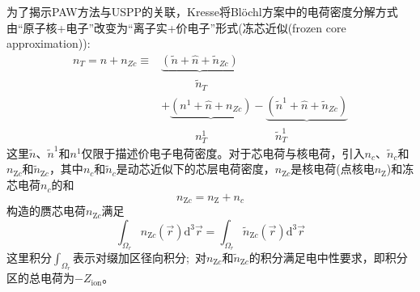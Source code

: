 \documentclass{article}      %
\begin{document}
为了揭示\textrm{PAW}方法与\textrm{USPP}的关联，\textrm{Kresse}将\textrm{Bl\"ochl}方案中的电荷密度分解方式由“原子核+电子”改变为“离子实+价电子”形式(冻芯近似(\textrm{frozen core approximation})):~
\begin{equation}
	\begin{aligned}
		n_T=n+n_{Zc}\equiv&\underbrace{(\tilde n+\hat n+\tilde n_{Zc})}\\
				 		&\quad\qquad\tilde n_T\\
				  &+\underbrace{(n^1+\hat n+n_{Zc})}-\underbrace{(\tilde n^1+\hat n+\tilde n_{Zc})}\\
				                  &\quad\qquad n_T^1\qquad\qquad\qquad\tilde n_T^1
	\end{aligned}
	\label{eq:PAW_Kresse_02}
\end{equation}
这里$\tilde n$、$\tilde n^1$和$n^1$仅限于描述价电子电荷密度。对于芯电荷与核电荷，引入$n_c$、$\tilde n_c$和$n_{\mathrm{Z}c}$和$\tilde n_{\mathrm{Z}c}$，其中$n_c$和$\tilde n_c$是动芯近似下的芯层电荷密度，$n_{\mathrm{Z}c}$是核电荷(点核电$n_{\mathrm Z}$)和冻芯电荷$n_c$的和
\begin{displaymath}
	n_{\mathrm{Z}c}=n_{\mathrm{Z}}+n_c
\end{displaymath}
构造的赝芯电荷$n_{\mathrm{Z}c}$满足
\begin{equation}
	\int_{\Omega_r}n_{\mathrm{Z}c}(\vec r)\mathrm{d}^3\vec r=\int_{\Omega_r}\tilde n_{\mathrm{Z}c}(\vec r)\mathrm{d}^3\vec r
	\label{eq:PAW_Kresse_01}
\end{equation}
这里积分$\int_{\Omega_r}$表示对缀加区径向积分;~对$n_{\mathrm{Z}c}$和$\tilde n_{\mathrm{Z}c}$的积分满足电中性要求，即积分区的总电荷为$-Z_{\mathrm{ion}}$。%
\end{document}
